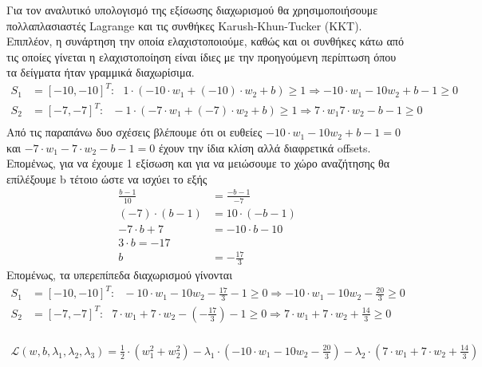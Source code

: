 \documentclass{article}
\begin{document}
	\noindent
	Για τον αναλυτικό υπολογισμό της εξίσωσης διαχωρισμού θα χρησιμοποιήσουμε πολλαπλασιαστές Lagrange και τις συνθήκες Karush-Khun-Tucker (KKT). Επιπλέον, η συνάρτηση την οποία ελαχιστοποιούμε, καθώς και οι συνθήκες κάτω από τις οποίες γίνεται η ελαχιστοποίηση είναι ίδιες με την προηγούμενη περίπτωση όπου τα δείγματα ήταν γραμμικά διαχωρίσιμα.\\
	
	\begin{align*}
		S_{1} &= [-10,-10]^{T} : \ \ \ 1 \cdot ( -10 \cdot w_{1} + (-10) \cdot w_{2} + b) \ge 1 \Rightarrow 
		-10 \cdot w_{1} - 10 w_{2}  + b - 1 \ge 0 \\
		S_{2} &= [-7,-7]^{T} : \ \ \ -1 \cdot ( -7 \cdot w_{1} + (-7) \cdot w_{2} + b) \ge 1 \Rightarrow 
		7 \cdot w_{1} 7\cdot w_{2} - b - 1 \ge 0 \\
	\end{align*}	
	Από τις παραπάνω δυο σχέσεις βλέπουμε ότι οι ευθείες $-10 \cdot w_{1} - 10 w_{2}  + b - 1 = 0$ και $-7 \cdot w_{1} - 7\cdot w_{2} - b - 1 = 0 $ έχουν την ίδια κλίση αλλά διαφρετικά offsets. Επομἐνως, για να έχουμε 1 εξίσωση και για να μειώσουμε το χώρο αναζήτησης θα επίλέξουμε b τέτοιο ώστε να ισχύει το εξής
	\begin{align*}
		\frac{b - 1}{10} &= \frac{ -b - 1}{-7} \\
		(-7) \cdot (b - 1) &= 10 \cdot ( -b - 1) \\
		-7 \cdot b + 7 &= -10 \cdot b - 10 \\
		3 \cdot b = -17 \\
		b &= -\frac{17}{3}
	\end{align*}
	\noindent
	Eπομένως, τα υπερεπίπεδα διαχωρισμού γίνονται
	\begin{align*}
		S_{1} &= [-10,-10]^{T} : \ \ \ -10 \cdot w_{1} - 10 w_{2} - \frac{17}{3} - 1 \ge 0 \Rightarrow -10 \cdot w_{1} - 10 w_{2} - \frac{20}{3} \ge 0\\
		S_{2} &= [-7,-7]^{T} : \ \ \ 7 \cdot w_{1} + 7\cdot w_{2} - \left( -\frac{17}{3} \right) - 1 \ge 0 \Rightarrow 7 \cdot w_{1} + 7\cdot w_{2} + \frac{14}{3} \ge 0 \\
	\end{align*}

	\begin{align*}
		\mathcal{L}(w,b,λ_{1},λ_{2},λ_{3}) = \frac{1}{2} \cdot (w_{1}^{2} + w_{2}^{2}) - 
		λ_{1} \cdot \left(-10 \cdot w_{1} - 10 w_{2} - \frac{20}{3}\right) -
		λ_{2} \cdot \left(7 \cdot w_{1} + 7\cdot w_{2} + \frac{14}{3}\right)
	\end{align*}
	
\end{document}
